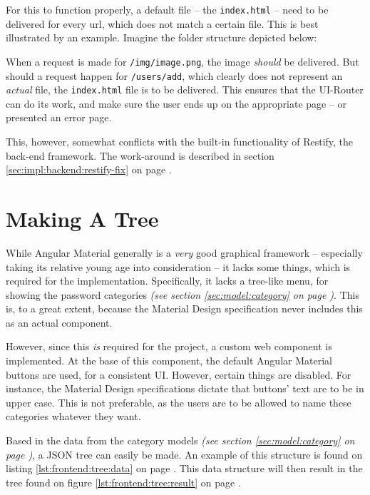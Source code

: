 		For this to function properly, a default file -- the \verb=index.html= -- need to be delivered for every url, which does not match a certain file. This is best illustrated by an example. Imagine the folder structure depicted below:

		When a request is made for \verb=/img/image.png=, the image \emph{should} be delivered. But should a request happen for \verb=/users/add=, which clearly does not represent an \emph{actual} file, the \verb=index.html= file is to be delivered. This ensures that the UI-Router can do its work, and make sure the user ends up on the appropriate page -- or presented an error page.

		This, however, somewhat conflicts with the built-in functionality of Restify, the back-end framework. The work-around is described in section \ref{sec:impl:backend:restify-fix} on page \pageref{sec:impl:backend:restify-fix}.

	\section{Making A Tree}
		While Angular Material generally is a \emph{very} good graphical framework -- especially taking its relative young age into consideration -- it lacks some things, which is required for the implementation. Specifically, it lacks a tree-like menu, for showing the password categories \emph{(see section \ref{sec:model:category} on page \pageref{sec:model:category})}. This is, to a great extent, because the Material Design specification never includes this as an actual component. 

		However, since this \emph{is} required for the project, a custom web component is implemented. At the base of this component, the default Angular Material buttons are used, for a consistent UI. However, certain things are disabled. For instance, the Material Design specifications dictate that buttons' text are to be in upper case. This is not preferable, as the users are to be allowed to name these categories whatever they want.

		Based in the data from the category models \emph{(see section \ref{sec:model:category} on page \pageref{sec:model:category})}, a JSON tree can easily be made. An example of this structure is found on listing \ref{lst:frontend:tree:data} on page \pageref{lst:frontend:tree:data}. This data structure will then result in the tree found on figure \ref{lst:frontend:tree:result} on page \pageref{lst:frontend:tree:result}.


